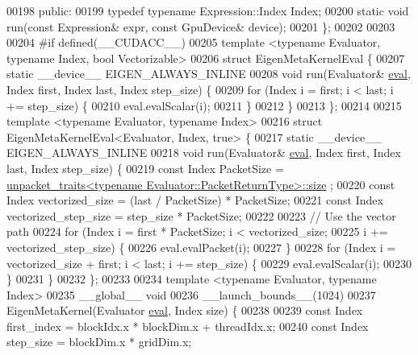 \begin{DoxyCode}
{00198  \textcolor{keyword}{public}:
00199   \textcolor{keyword}{typedef} \textcolor{keyword}{typename} Expression::Index Index;
00200   \textcolor{keyword}{static} \textcolor{keywordtype}{void} run(\textcolor{keyword}{const} Expression& expr, \textcolor{keyword}{const} GpuDevice& device);
00201 \};
00202 
00203 
00204 \textcolor{preprocessor}{#if defined(\_\_CUDACC\_\_)}
00205 \textcolor{keyword}{template} <\textcolor{keyword}{typename} Evaluator, \textcolor{keyword}{typename} Index, \textcolor{keywordtype}{bool} Vectorizable>
00206 \textcolor{keyword}{struct }EigenMetaKernelEval \{
00207   \textcolor{keyword}{static} \_\_device\_\_ EIGEN\_ALWAYS\_INLINE
00208   \textcolor{keywordtype}{void} run(Evaluator& \hyperlink{struct_eigen_1_1internal_1_1eval}{eval}, Index first, Index last, Index step\_size) \{
00209     \textcolor{keywordflow}{for} (Index i = first; i < last; i += step\_size) \{
00210       eval.evalScalar(i);
00211     \}
00212   \}
00213 \};
00214 
00215 \textcolor{keyword}{template} <\textcolor{keyword}{typename} Evaluator, \textcolor{keyword}{typename} Index>
00216 \textcolor{keyword}{struct }EigenMetaKernelEval<Evaluator, Index, true> \{
00217   \textcolor{keyword}{static} \_\_device\_\_ EIGEN\_ALWAYS\_INLINE
00218   \textcolor{keywordtype}{void} run(Evaluator& \hyperlink{struct_eigen_1_1internal_1_1eval}{eval}, Index first, Index last, Index step\_size) \{
00219     \textcolor{keyword}{const} Index PacketSize = 
      \hyperlink{struct_eigen_1_1internal_1_1unpacket__traits}{unpacket\_traits<typename Evaluator::PacketReturnType>::size}
      ;
00220     \textcolor{keyword}{const} Index vectorized\_size = (last / PacketSize) * PacketSize;
00221     \textcolor{keyword}{const} Index vectorized\_step\_size = step\_size * PacketSize;
00222 
00223     \textcolor{comment}{// Use the vector path}
00224     \textcolor{keywordflow}{for} (Index i = first * PacketSize; i < vectorized\_size;
00225          i += vectorized\_step\_size) \{
00226       eval.evalPacket(i);
00227     \}
00228     \textcolor{keywordflow}{for} (Index i = vectorized\_size + first; i < last; i += step\_size) \{
00229       eval.evalScalar(i);
00230     \}
00231   \}
00232 \};
00233 
00234 \textcolor{keyword}{template} <\textcolor{keyword}{typename} Evaluator, \textcolor{keyword}{typename} Index>
00235 \_\_global\_\_ \textcolor{keywordtype}{void}
00236 \_\_launch\_bounds\_\_(1024)
00237 EigenMetaKernel(Evaluator \hyperlink{struct_eigen_1_1internal_1_1eval}{eval}, Index size) \{
00238 
00239   \textcolor{keyword}{const} Index first\_index = blockIdx.x * blockDim.x + threadIdx.x;
00240   \textcolor{keyword}{const} Index step\_size = blockDim.x * gridDim.x;
}
\end{DoxyCode}
